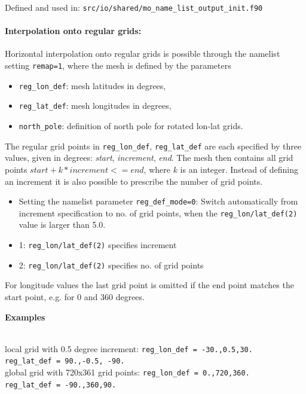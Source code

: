 Defined and used in: \verb+src/io/shared/mo_name_list_output_init.f90+

\paragraph{Interpolation onto regular grids:}

Horizontal interpolation onto regular grids is possible through the namelist setting  \texttt{remap=1}, where
the mesh is defined by the parameters
\begin{itemize}
  \item \texttt{reg\_lon\_def}: mesh latitudes in degrees,
  \item \texttt{reg\_lat\_def}: mesh longitudes in degrees,
  \item \texttt{north\_pole}: definition of north pole for rotated lon-lat grids.
\end{itemize}
The regular grid points in \texttt{reg\_lon\_def}, \texttt{reg\_lat\_def} are each specified by three values, given in degrees:
\emph{start}, \emph{increment}, \emph{end}.
The mesh then contains all grid points $start + k * increment <= end$, where $k$ is an integer.
Instead of defining an increment it is also possible to prescribe the number of grid points.
\begin{itemize}
  \item Setting the namelist parameter \texttt{reg\_def\_mode=0}:
        Switch automatically from increment specification to no. of grid points,
        when the  \texttt{reg\_lon/lat\_def(2)} value is larger than 5.0.
  \item 1: \texttt{reg\_lon/lat\_def(2)} specifies increment
  \item 2: \texttt{reg\_lon/lat\_def(2)} specifies no. of grid points
\end{itemize}
For longitude values the last grid point is omitted if the end point matches the start point, e.g. for 0 and 360 degrees.

\begin{tabbing}
  \parbox{0.7\textwidth}{\textbf{Examples}} \= \\
  local grid with 0.5 degree increment: \>
  \texttt{reg\_lon\_def = -30.,0.5,30.}
  \\ \>
  \texttt{reg\_lat\_def = 90.,-0.5, -90.}
  \\[0.5em]
  global grid with 720x361 grid points: \>
  \texttt{reg\_lon\_def = 0.,720,360.}
  \\ \>
  \texttt{reg\_lat\_def = -90.,360,90.}
\end{tabbing}



